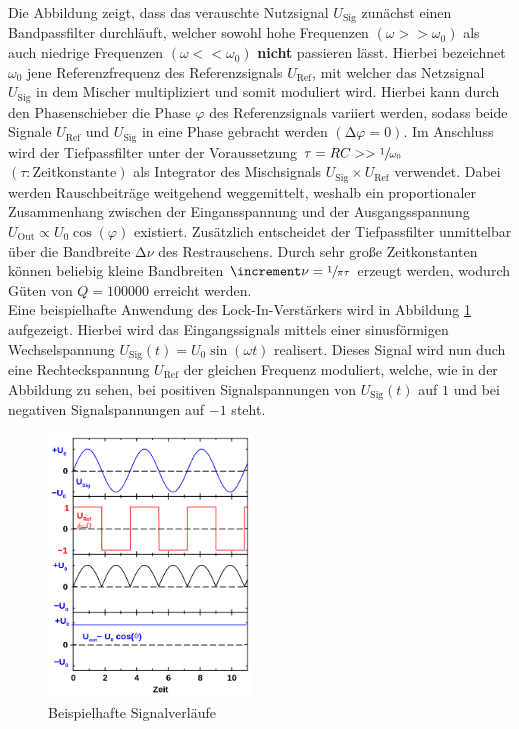 \noindent Die Abbildung zeigt, dass das verauschte Nutzsignal $U_\text{Sig}$ zunächst einen Bandpassfilter durchläuft,
welcher sowohl hohe Frequenzen $\left(\omega >> \omega_0\right)$ als auch niedrige Frequenzen $\left(\omega << \omega_0\right)$
\textbf{nicht} passieren lässt. Hierbei bezeichnet $\omega_0$ jene Referenzfrequenz des Referenzsignals $U_\text{Ref}$, mit welcher 
das Netzsignal $U_\text{Sig}$ in dem Mischer multipliziert und somit moduliert wird. Hierbei kann durch den Phasenschieber die Phase  
$\varphi$ des Referenzsignals variiert werden, sodass beide Signale $U_\text{Ref}$ und $U_\text{Sig}$ in eine Phase gebracht werden 
$\left(\increment \varphi = 0\right)$. Im Anschluss wird der Tiefpassfilter unter der Voraussetzung $\tau = RC >> \sfrac{1}{\omega_0}$ 
$\left(\tau: \text{Zeitkonstante}\right)$ als Integrator des Mischsignals $U_\text{Sig} \times U_\text{Ref}$ verwendet. Dabei werden 
Rauschbeiträge weitgehend weggemittelt, weshalb ein proportionaler Zusammenhang zwischen der Eingansspannung und der Ausgangsspannung $U_\text{Out} \propto U_0\cos(\varphi)$ 
existiert. Zusätzlich entscheidet der Tiefpassfilter unmittelbar über die Bandbreite $\increment\nu$ des
Restrauschens. Durch sehr große Zeitkonstanten können beliebig kleine Bandbreiten $\increment\nu = \sfrac{1}{\pi\tau}$ erzeugt werden,
wodurch Güten von $Q = 100000$ erreicht werden.\\
Eine beispielhafte Anwendung des Lock-In-Verstärkers wird in Abbildung \ref{fig:AWD} aufgezeigt. Hierbei wird das Eingangssignals 
mittels einer sinusförmigen Wechselspannung $U_\text{Sig}(t) = U_{0}\sin(\omega t)$ realisert. Dieses Signal wird nun duch eine
Rechteckspannung $U_\text{Ref}$ der gleichen Frequenz moduliert, welche, wie in der Abbildung zu sehen, bei positiven Signalspannungen
von $U_\text{Sig}(t)$ auf $1$ und bei negativen Signalspannungen auf $-1$ steht.

\begin{figure}
    \centering
    \includegraphics[height=7cm]{AWD.png}
    \caption{Beispielhafte Signalverläufe}
    \label{fig:AWD}
\end{figure}


